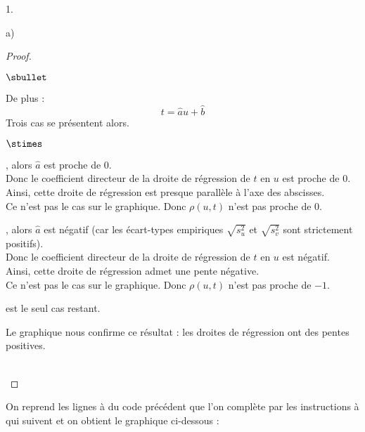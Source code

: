 \documentclass[11pt]{article}%
\begin{document}
\begin{noliste}{1.}
\begin{noliste}{a)}
\begin{proof}
\begin{noliste}{$\sbullet$}
    \item De plus :
    \[
     t = \hat{a} u + \hat{b}
    \]
    Trois cas se présentent alors.
    \begin{noliste}{$\stimes$}
      \item {}, alors
      $\hat{a}$ est proche de $0$.\\[.1cm]
      Donc le coefficient directeur de la droite de régression de $t$ 
      en $u$ est proche de $0$.\\
      Ainsi, cette droite de régression est presque parallèle à 
      l'axe des abscisses.\\
      Ce n'est pas le cas sur le graphique. Donc $\rho(u,t)$ 
      n'est pas proche de $0$.
      
      \item {}, alors
      $\hat{a}$ est négatif (car les écart-types empiriques
      $\sqrt{s_u^2}$ et $\sqrt{s_v^2}$ sont strictement positifs).\\
      Donc le coefficient directeur de la droite de régression de $t$ 
      en $u$ est négatif.\\
      Ainsi, cette droite de régression admet une pente négative.\\
      Ce n'est pas le cas sur le graphique. Donc $\rho(u,t)$ 
      n'est pas proche de $-1$.
      
      \item {} est le 
      seul cas restant.
    \end{noliste}
   \end{noliste}
   
   \begin{remarkL}{0.95}
     Le graphique nous confirme ce résultat : les droites 
     de régression ont des pentes positives.
   \end{remarkL}~\\[-1.4cm]
  \end{proof}
  
  
  
  
  \newpage
  

  
  \item On reprend les lignes  à 
   du code précédent que l'on complète par les 
  instructions  à  
  qui suivent et on obtient le graphique ci-dessous :
  

\end{noliste}
\end{noliste}
\end{document}
